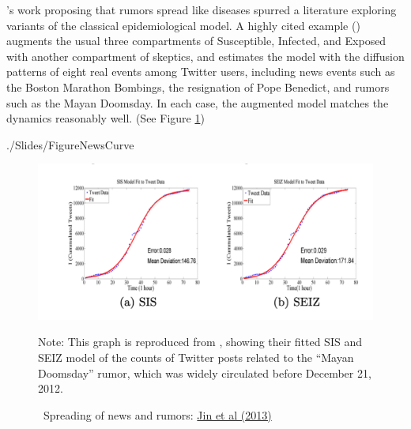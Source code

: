 \cite{daley1964epidemics}'s work proposing that rumors spread like diseases spurred a literature exploring variants of the classical epidemiological model.  A highly cited example (\cite{jin2013epidemiological}) augments the usual three compartments of Susceptible, Infected, and Exposed with another compartment of skeptics, and estimates the model with the diffusion patterns of eight real events among Twitter users, including news events such as the Boston Marathon Bombings, the resignation of Pope Benedict, and rumors such as the Mayan Doomsday.  In each case, the augmented model matches the dynamics reasonably well. (See Figure \ref{fig:news_curve})


\begin{verbatimwrite}{./Slides/FigureNewsCurve}
	\begin{figure}[!ht] \centering  %
		\caption{ ~Spreading of news and rumors: \href{https://people.cs.vt.edu/ramakris/papers/news-rumor-epi-snakdd13.pdf}{Jin et al (2013)}}\nocite{jin2013epidemiological}
		\label{fig:news_curve}
		\centerline{\includegraphics[width=\textwidth]{./figures/Doomsday}}
		\begin{flushleft}{\footnotesize Note: This graph is reproduced from \cite{jin2013epidemiological}, showing their fitted SIS and SEIZ model of the counts of Twitter posts related to the ``Mayan Doomsday'' rumor, which was widely circulated before December 21, 2012.}
		\end{flushleft}
	\end{figure}
\end{verbatimwrite}%

